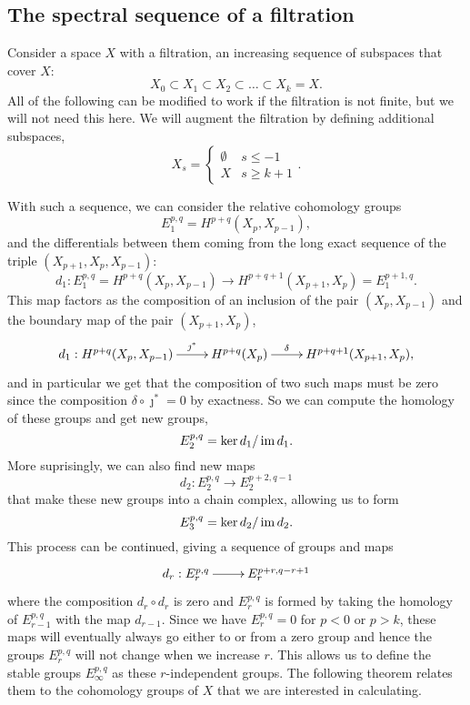 \subsection{The spectral sequence of a filtration}
\label{sec:ss-filtration}

Consider a space $X$ with a filtration, an increasing sequence
of subspaces that cover $X$:
\[ X_0 \subset X_1 \subset X_2 \subset
\dots \subset X_k  = X. \]
All of the following can be modified to work if the filtration is not
finite, but we will not need this here. We will augment the filtration
by defining additional subspaces,
\[ X_s =
\begin{cases}
  \emptyset & s \leq -1 \\
  X & s \geq k+1
\end{cases}. \]

With such a sequence, we can
consider the relative cohomology groups
\[ E_1^{p,q} = H^{p+q}(X_p,X_{p-1}), \]
and the differentials between them coming from the long exact sequence
of the triple $(X_{p+1},X_p,X_{p-1})$:
\[ d_1 : E_1^{p,q} = H^{p+q}(X_p,X_{p-1}) \to H^{p+q+1}(X_{p+1},X_p) =
E_1^{p+1,q}. \]
This map factors as the composition of an
inclusion of the pair $(X_p,X_{p-1})$ and the boundary map of the pair
$(X_{p+1},X_p)$,
\[ \xymatrix{ d_1 : H^{p+q}(X_p,X_{p-1}) \ar[r]^<<<<<{\jmath^*} &
  H^{p+q}(X_p) \ar[r]^<<<<<{\delta} & H^{p+q+1}(X_{p+1},X_p),
} \]
and in particular we get that the composition of two such maps must be
zero since the composition $\delta \circ \jmath^* = 0$ by
exactness. So we can compute the homology of these groups and get new
groups,
\[ E_2^{p,q} = \ker d_1 / \operatorname{im} d_1. \]
More suprisingly, we can also find new maps
\[ d_2 : E_2^{p,q} \to E_2^{p+2,q-1} \]
that make these new groups into a chain complex, allowing us to form
\[ E_3^{p,q} = \ker d_2 / \operatorname{im} d_2. \]
This process can be continued, giving a sequence of groups and maps
\[ \xymatrix{d_r : E_r^{p,q} \ar[r] & E_r^{p+r,q-r+1} } \]
where the composition $d_r \circ d_r$ is zero and
$E_r^{p,q}$ is formed by taking the homology of $E_{r-1}^{p,q}$ with
the map $d_{r-1}$. Since we have $E_r^{p,q} = 0$ for $p < 0$ or $p >
k$, these maps will eventually always go either to or from a zero
group and hence the groups $E_r^{p,q}$ will not change when we
increase $r$. This allows us to
define the stable groups $E_\infty^{p,q}$ as these $r$-independent
groups. The following theorem relates them to the cohomology groups of
$X$ that we are interested in calculating.

